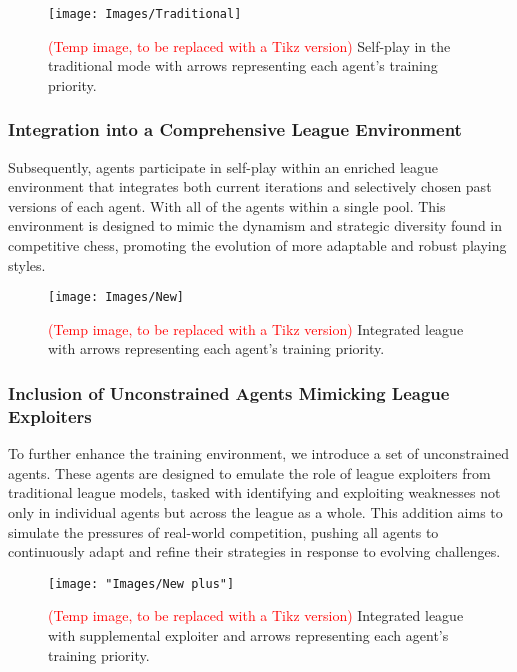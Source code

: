 \documentclass[journal]{IEEEtran}
\begin{document}
	\begin{figure}
		\centering
		\texttt{[image: Images/Traditional]}
		\caption{\textcolor{red}{(Temp image, to be replaced with a Tikz version)} Self-play in the traditional mode with arrows representing each agent's training priority.}
		\label{fig:traditional}
	\end{figure}

	
	\subsubsection{Integration into a Comprehensive League Environment} 
	Subsequently, agents participate in self-play within an enriched league environment that 
	integrates both current iterations and selectively chosen past versions of each agent.
	With all of the agents within a single pool.
	This environment is designed to mimic the dynamism and strategic diversity found in competitive chess, 
	promoting the evolution of more adaptable and robust playing styles.

\begin{figure}
	\centering
	\texttt{[image: Images/New]}
	\caption{\textcolor{red}{(Temp image, to be replaced with a Tikz version)} Integrated league with arrows representing each agent's training priority.}
	\label{fig:new}
\end{figure}

	\subsubsection{Inclusion of Unconstrained Agents Mimicking League Exploiters} 
	To further enhance the training environment, we introduce a set of unconstrained agents. 
	These agents are designed to emulate the role of league exploiters from traditional league models, 
	tasked with identifying and exploiting weaknesses not only in individual agents but across the league as a whole. 
	This addition aims to simulate the pressures of real-world competition, 
	pushing all agents to continuously adapt and refine their strategies in response to evolving challenges.
	
\begin{figure}
	\centering
	\texttt{[image: "Images/New plus"]}
	\caption{\textcolor{red}{(Temp image, to be replaced with a Tikz version)} Integrated league with supplemental exploiter and arrows representing each agent's training priority.}
	\label{fig:new-plus}
\end{figure}
	
\end{document}
